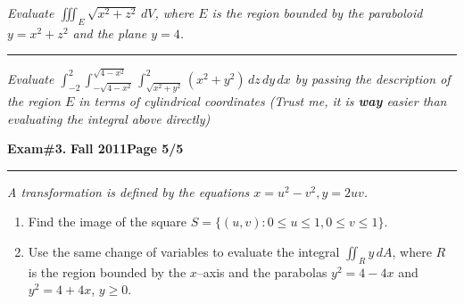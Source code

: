 \documentclass[12pt]{article}
\begin{document}
\bigskip
{\problem[10 pts] \em Evaluate $\iiint_E \sqrt{x^2+z^2}\, dV$, where
  $E$ is the region bounded by the paraboloid $y=x^2+z^2$ and the
  plane $y=4$.}
\vspace{8cm}
\begin{flushright}
\end{flushright}
\hrule
{\problem[15 pts] \em Evaluate $\int_{-2}^2
  \int_{-\sqrt{4-x^2}}^{\sqrt{4-x^2}} \int_{\sqrt{x^2+y^2}}^2
  (x^2+y^2)\, dz\, dy\, dx$ by passing the description of the region
  $E$ in terms of cylindrical coordinates (Trust me, it is
  \textbf{way} easier than evaluating the integral above directly)}
\vspace{8cm}
\begin{flushright}
\end{flushright}
\newpage

\hfill{\large\bf Exam\#3.}\hfill{\large\bf
  Fall 2011}\hfill{\large\bf Page 5/5}\hrule

\bigskip
{\problem[20 pts] \em A transformation is defined by the equations
  $x=u^2-v^2, y=2uv$.}
\begin{enumerate}
\item Find the image of the square $S=\big\{ (u,v) : 0 \leq u \leq 1,
  0 \leq v \leq 1 \big\}$.
\item Use the same change of variables to evaluate the integral
  $\iint_R y\, dA$, where $R$ is the region bounded by the $x$--axis
  and the parabolas $y^2=4-4x$ and $y^2=4+4x$, $y\geq 0$.
\end{enumerate}
\vspace{14.5cm}
\begin{flushright}
\end{flushright}
\end{document}
